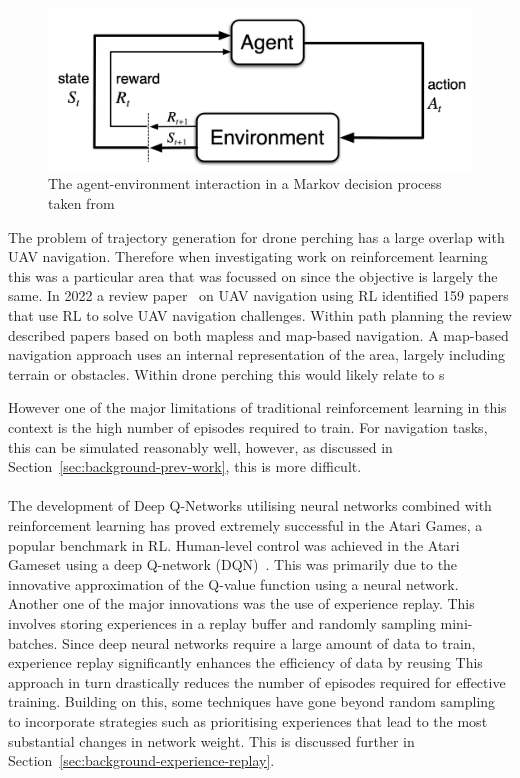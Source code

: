 \begin{figure}[htbp]
  \centering
  \includegraphics[width=\textwidth]{background/agent-environment-diagram.png}
  \caption{The agent-environment interaction in a Markov decision process taken from~\cite{rlIntroSuttonBarlo}}
\label{fig:rl-intro-drone}
\end{figure}

The problem of trajectory generation for drone perching has a large overlap with UAV navigation.
Therefore when investigating work on reinforcement learning this was a particular area that was focussed on since the objective is largely the same.
In 2022 a review paper~\cite{aerialNavReview} on UAV navigation using RL identified 159 papers that use RL to solve UAV navigation challenges.
Within path planning the review described papers based on both mapless and map-based navigation.
A map-based navigation approach uses an internal representation of the area, largely including terrain or obstacles.
Within drone perching this would likely relate to s 

However one of the major limitations of traditional reinforcement learning in this context is the high number of episodes required to train.
For navigation tasks, this can be simulated reasonably well, however, as discussed in Section~\ref{sec:background-prev-work}, this is more difficult. \\\\


The development of Deep Q-Networks utilising neural networks combined with reinforcement learning has proved extremely successful in the Atari Games, a popular benchmark in RL.
Human-level control was achieved in the Atari Gameset using a deep Q-network (DQN)~\cite{humanLevelControlDQN}.
This was primarily due to the innovative approximation of the Q-value function using a neural network.
Another one of the major innovations was the use of experience replay.
This involves storing experiences in a replay buffer and randomly sampling mini-batches.
Since deep neural networks require a large amount of data to train, experience replay significantly enhances the efficiency of data by reusing
This approach in turn drastically reduces the number of episodes required for effective training.
Building on this, some techniques have gone beyond random sampling to incorporate strategies such as prioritising experiences that lead to the most substantial changes in network weight.
This is discussed further in Section~\ref{sec:background-experience-replay}.

